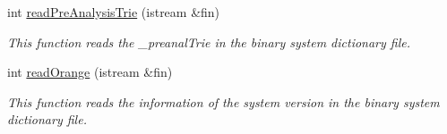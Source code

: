 \begin{CompactItemize}
int \hyperlink{classkmaOrange_1_1Dictionary_f4ca7d3733a754e37e41559b64e424da}{readPreAnalysisTrie} (istream \&fin)
\begin{CompactList}\small\item\em This function reads the \_\-preanalTrie in the binary system dictionary file. \item\end{CompactList}\item 
int \hyperlink{classkmaOrange_1_1Dictionary_f821ce9abfd00218d4f2092d3b0dc710}{readOrange} (istream \&fin)
\begin{CompactList}\small\item\em This function reads the information of the system version in the binary system dictionary file. \item\end{CompactList}\end{CompactItemize}
